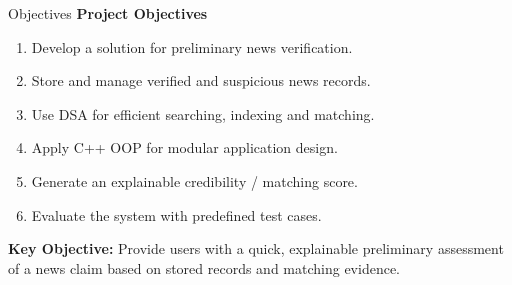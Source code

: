\documentclass[aspectratio=169,10pt]{beamer}
\def\tightlistspacing{%
  \setlength{\itemsep}{1.2pt}%
  \setlength{\parsep}{0pt}%
  \setlength{\topsep}{1pt}%
  \setlength{\partopsep}{0pt}%
}
\begin{document}
\begin{frame}{Objectives}
\textbf{\color{GEUBlue}\footnotesize Project Objectives}
\vspace{1mm}
\begin{enumerate}\small\tightlistspacing
\item Develop a solution for preliminary news verification.
\item Store and manage verified and suspicious news records.
\item Use DSA for efficient searching, indexing and matching.
\item Apply C++ OOP for modular application design.
\item Generate an explainable credibility / matching score.
\item Evaluate the system with predefined test cases.
\end{enumerate}

\vspace{2.5mm}
\begingroup
\centering
\noindent\colorbox{GEULightBlue}{%
\parbox{\dimexpr.88\textwidth-2\fboxsep\relax}{%
\centering\footnotesize
\textbf{Key Objective:} Provide users with a quick, explainable preliminary assessment of a news claim based on stored records and matching evidence.
}}%
\par
\endgroup
\end{frame}
\end{document}
